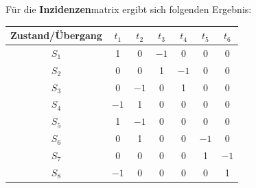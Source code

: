 \documentclass{article}
\begin{document}
\newpage
		Für die \textbf{Inzidenzen}matrix ergibt sich folgenden Ergebnis:\\
		\begin{center}
			\begin{tabular}{| c || c c c c c c |}
				\hline
				Zustand/Übergang	 & $t_1$ & $t_2$ & $t_3$ & $t_4$ & $t_5$ & $t_6$ \\
				\hline\hline
				$S_1$ & 1 & 0 & $-1$ & 0 & 0 & 0\\
				$S_2$ & 0 & 0 & 1 & $-1$ & 0 & 0\\
				$S_3$ & 0 & $-1$ & 0 & 1 & 0 & 0\\
				$S_4$ & $-1$ & 1 & 0 & 0 & 0 & 0\\
				$S_5$ & 1 & $-1$ & 0 & 0 & 0 & 0\\
				$S_6$ & 0 & 1 & 0 & 0 & $-1$ & 0\\
				$S_7$ & 0 & 0 & 0 & 0 & 1 & $-1$\\
				$S_8$ & $-1$ & 0 & 0 & 0 & 0 & 1\\
				\hline
			\end{tabular}
		\end{center}
\newpage
\end{document}
